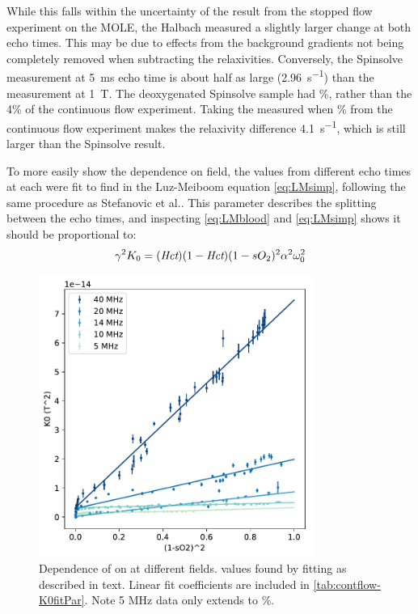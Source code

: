 While this falls within the uncertainty of the result from the stopped flow experiment on the MOLE, the Halbach measured a slightly larger \Rtwo change at both echo times.
This may be due to effects from the background gradients not being completely removed when subtracting the relaxivities.
Conversely, the Spinsolve measurement at \SI{5}{ms} echo time is about half as large (\SI{2.96}{s^{-1}}) than the measurement at \SI{1}{T}.
The deoxygenated Spinsolve sample had \%, rather than the 4\% of the continuous flow experiment.
Taking the measured \Rtwo when \%  from the continuous flow experiment makes the relaxivity difference \SI{4.1}{s^{-1}}, which is still larger than the Spinsolve result.

To more easily show the dependence on field, the \Ttwo values from different echo times at each \SOtwo were fit to find \Kzero in the Luz-Meiboom equation \autoref{eq:LMsimp}, following the same procedure as Stefanovic et al.\cite{StefanovicHumanwholebloodrelaxometry2004}.
This parameter describes the splitting between the echo times, and inspecting \autoref{eq:LMblood} and \autoref{eq:LMsimp} shows it should be proportional to:
\begin{displaymath}
\gamma^2 K_0 = (\textit{Hct})(1-\textit{Hct})(1-sO_2)^2 \alpha^2 \omega_0^2
\end{displaymath}

\begin{figure}[tbh]
\centering
\includegraphics[width=0.8\textwidth]{figures/contflow/K0field.pdf}
\caption[Relationship between \Kzero on \SOtwo at different fields]{Dependence of \Kzero on \SOtwo at different fields. \Kzero values found by fitting as described in text. Linear fit coefficients are included in \autoref{tab:contflow-K0fitPar}. Note 5 MHz data only extends to \%.}
\label{fig:contflow-K0field}
\end{figure}

